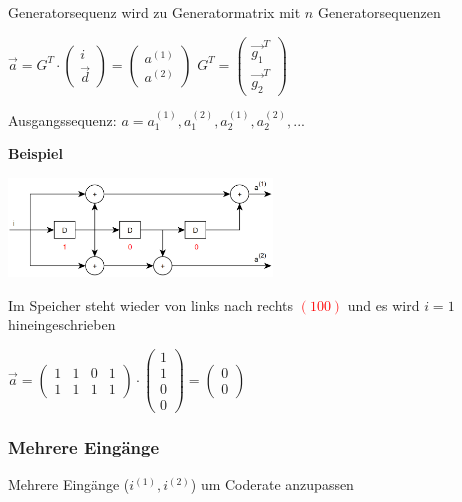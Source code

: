Generatorsequenz wird zu Generatormatrix mit $n$ Generatorsequenzen

$\displaystyle{
    \vec{a} = G^T \cdot
    \begin{pmatrix}
        i\\
        \vec{d}
    \end{pmatrix} =
    \begin{pmatrix}
        a^{(1)}\\
        a^{(2)}
    \end{pmatrix}
}$\;\;\;\;\;\;\;\;\;\;\;\;\;
$\displaystyle{
    G^T =
    \begin{pmatrix}
        \vec{g_1}^T\\
        \vec{g_2}^T
    \end{pmatrix}
}$

Ausgangssequenz: $a = a^{(1)}_1, a^{(2)}_1, a^{(1)}_2, a^{(2)}_2, ...$

\textbf{Beispiel}

\includegraphics[width=7cm]{img/faltungscoder1in2out.PNG}

Im Speicher steht wieder von links nach rechts \textcolor{red}{$ (1 0 0) $} und es wird $i = 1$ hineingeschrieben

$\displaystyle{
    \vec{a} =
    \begin{pmatrix}
        1 & 1 & 0 & 1\\
        1 & 1 & 1 & 1
    \end{pmatrix}
    \cdot
    \begin{pmatrix}
        1\\
        1\\
        0\\
        0
    \end{pmatrix} =
    \begin{pmatrix}
        0\\
        0
    \end{pmatrix}
}$

\subsubsection{Mehrere Eingänge}

Mehrere Eingänge ($i^{(1)}, i^{(2)}$) um Coderate anzupassen


